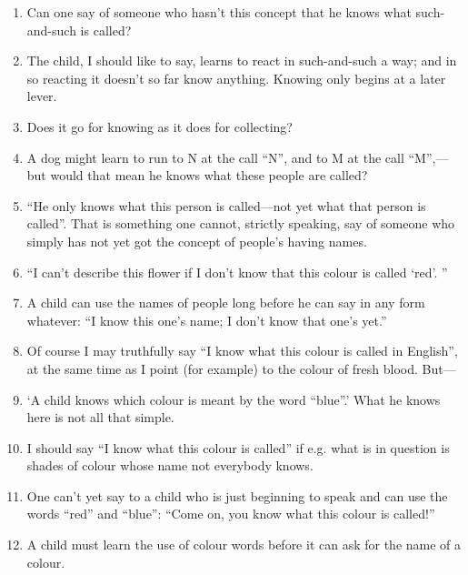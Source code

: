 \documentclass{book}
\begin{document}
\begin{enumerate}
\item
Can one say of someone who hasn't this concept that he knows what such-and-such
is called?

\item
The child, I should like to say, learns to react in such-and-such a way; and in
so reacting it doesn't so far know anything. Knowing only begins at a later
lever.

\item
Does it go for knowing as it does for collecting?

\item
A dog might learn to run to N at the call ``N'', and to M at the call
``M'',---but would that mean he knows what these people are called?

\item
``He only knows what this person is called---not yet what that person is
called''. That is something one cannot, strictly speaking, say of someone who
simply has not yet got the concept of people's having names.

\item
``I can't describe this flower if I don't know that this colour is called
`red'. ''

\item
A child can use the names of people long before he can say in any form
whatever: ``I know this one's name; I don't know that one's yet.''

\item
Of course I may truthfully say ``I know what this colour is called in
English'', at the same time as I point (for example) to the colour of fresh
blood. But---

\item
`A child knows which colour is meant by the word ``blue''.' What he knows here
is not all that simple.

\item
I should say ``I know what this colour is called'' if e.g. what is in question
is shades of colour whose name not everybody knows.

\item
One can't yet say to a child who is just beginning to speak and can use the
words ``red'' and ``blue'': ``Come on, you know what this colour is called!''

\item
A child must learn the use of colour words before it can ask for the name of a
colour.


\end{enumerate}
\end{document}
